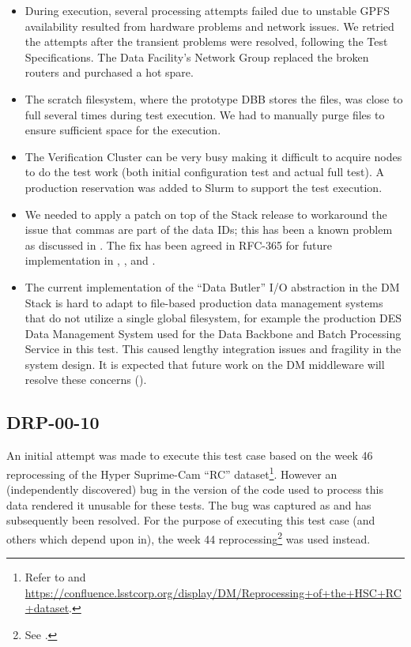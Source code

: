 \documentclass[DM,lsstdraft,STR,toc]{lsstdoc}
\begin{document}
\begin{itemize}

  \item{
    During execution, several processing attempts failed due to unstable GPFS availability resulted from hardware problems and network issues.
    We retried the attempts after the transient problems were resolved, following the Test Specifications.
    The Data Facility's Network Group replaced the broken routers and purchased a hot spare.
  }

  \item{
    The scratch filesystem, where the prototype DBB stores the files, was close to full several times during test execution.
	We had to manually purge files to ensure sufficient space for the execution.
  }

  \item{
    The Verification Cluster can be very busy making it difficult to acquire nodes to do the test work (both initial configuration test and actual full test).
        A production reservation was added to Slurm to support the test execution.
  }

  \item{
    We needed to apply a patch on top of the Stack release to workaround the issue that commas are part of the data IDs; this has been a known problem as discussed in .
	The fix has been agreed in RFC-365 for future implementation in , , and .
  }

  \item{
    The current implementation of the “Data Butler” I/O abstraction in the DM Stack is hard to adapt to file-based production data management systems that do not utilize a single global filesystem, for example the production DES Data Management System used for the Data Backbone and Batch Processing Service in this test.
    This caused lengthy integration issues and fragility in the system design.
    It is expected that future work on the DM middleware will resolve these concerns ().
  }
\end{itemize}

\subsection{DRP-00-10}
\label{sect:problems-drp-00-10}

An initial attempt was made to execute this test case based on the week 46 reprocessing of the Hyper Suprime-Cam ``RC'' dataset\footnote{Refer to  and \url{https://confluence.lsstcorp.org/display/DM/Reprocessing+of+the+HSC+RC+dataset}.}.
However an (independently discovered) bug in the version of the code used to process this data rendered it unusable for these tests.
The bug was captured as  and has subsequently been resolved.
For the purpose of executing this test case (and others which depend upon in), the week 44 reprocessing\footnote{See .} was used instead.
\end{document}
